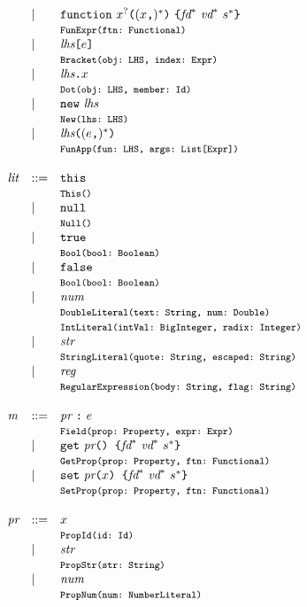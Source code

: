 \[
\begin{array}{llll}
 & \mid & {\tt function} \ \myid^?  \verb+(+(\myid\verb+,+)^*\verb+)+ \ \verb+{+\fd^*\ \vd^*\ \stmt^*\verb+}+ \\
&&\mtt{FunExpr(ftn:~Functional)}\\
 &\mid& \lhs \verb+[+ \expr \verb+]+ \\
&& \mtt{Bracket(obj:~LHS, index:~Expr)}\\
 &\mid& \lhs \verb+.+ \myid \\
&& \mtt{Dot(obj:~LHS, member:~Id)}\\
 &\mid& {\tt new} \ \lhs \\
&& \mtt{New(lhs:~LHS)}\\
 &\mid& \lhs \verb+(+ (\expr\verb+,+)^* \verb+)+ \\
&& \mtt{FunApp(fun:~LHS, args:~List[Expr])} \\ \\
\lit &::=& {\tt this} \\
&& \mtt{This()}\\
 &\mid& {\tt null} \\
&& \mtt{Null()}\\
 &\mid& {\tt true} \\
&& \mtt{Bool(bool:~Boolean)}\\
 &\mid& {\tt false} \\
&& \mtt{Bool(bool:~Boolean)}\\
 &\mid& \num \\
&& \mtt{DoubleLiteral(text:~String, num:~Double)}\\
&&\mtt{IntLiteral(intVal:~BigInteger, radix:~Integer)}\\
 &\mid& \str \\
&& \mtt{StringLiteral(quote:~String, escaped:~String)}\\
 &\mid& \reg \\
&& \mtt{RegularExpression(body:~String, flag:~String)}\\ \\

\member &::=& \prop \ \verb+:+ \ \expr \\
&& \mtt{Field(prop:~Property, expr:~Expr)}\\
 &\mid& {\tt get}\ \prop \verb+() {+ \fd^*\ \vd^*\ \stmt^* \verb+}+ \\
&& \mtt{GetProp(prop:~Property, ftn:~Functional)}\\
 &\mid& {\tt set}\ \prop \verb+(+ \myid \verb+) {+ \fd^*\ \vd^*\ \stmt^* \verb+}+\\
&& \mtt{SetProp(prop:~Property, ftn:~Functional)}\\ \\

\prop &::= & \myid \\
&& \mtt{PropId(id:~Id)}\\
 &\mid& \str \\
&& \mtt{PropStr(str:~String)}\\
 &\mid& \num \\
&& \mtt{PropNum(num:~NumberLiteral)}\\
\end{array}
\]

